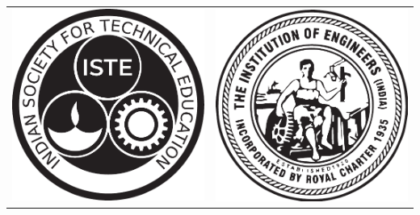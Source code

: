 \documentclass[12pt]{article}
\begin{document}
{\begin{center}
\begin{table}[h!]
\begin{tabular}{cc}
				\multicolumn{1}{c}{\includegraphics[scale=0.20]{ISTE-logo.pdf}} & \multicolumn{1}{c}{\includegraphics[scale=0.20]{IEI-logo.pdf}} \\ 

\end{tabular}
\end{table}
\end{center}}
\end{document}
